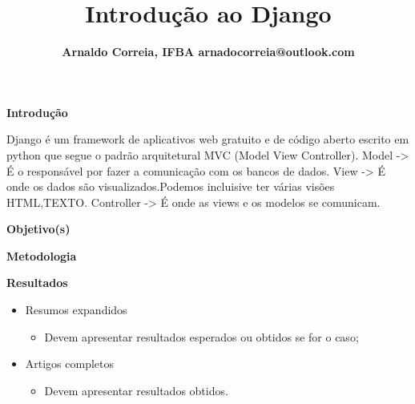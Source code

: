 \documentclass[18pt]{beamer}
\title[]{
{\fontsize{28pt}{30}\selectfont\textbf{Introdução ao Django}}}
\author{
{\fontsize{18pt}{20}\selectfont \textbf{
Arnaldo Correia, IFBA  arnadocorreia@outlook.com
}}}
\begin{document}
{\logotitle
\begin{frame}
\maketitle
\end{frame}
}



\begin{frame}{\fontsize{20pt}{20}\selectfont \textbf{Introdução}}

  Django é um framework de aplicativos web gratuito e de código aberto escrito em python
  que segue o padrão arquitetural MVC (Model View Controller).
  \newline
  Model -> É o responsável por fazer a comunicação com os bancos de dados.
  \newline
  View -> É onde os dados são visualizados.Podemos incluisive ter várias visões HTML,TEXTO.
  \newline
  Controller -> É onde as views e os modelos se comunicam.

\end{frame}



\begin{frame}{\fontsize{20pt}{20}\selectfont \textbf{Objetivo(s)}}



\end{frame}


\begin{frame}{\fontsize{20pt}{20}\selectfont \textbf{Metodologia}}



\end{frame}


\begin{frame}{\fontsize{20pt}{20}\selectfont \textbf{Resultados}}

\begin{itemize}
    \item Resumos expandidos
    \begin{itemize}
        \item Devem apresentar resultados esperados ou obtidos se for o caso;
    \end{itemize}
    \item Artigos completos
    \begin{itemize}
        \item Devem apresentar resultados obtidos.
    \end{itemize}
\end{itemize}

\end{frame}
\end{document}
